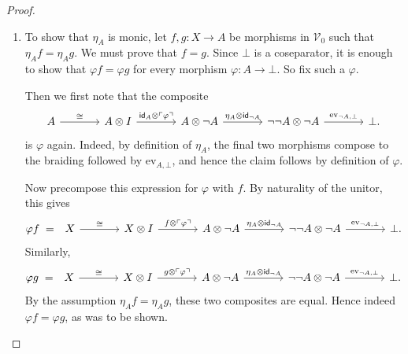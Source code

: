 \documentclass[11pt,onecolumn]{article}
\newcommand{\id}{\mathsf{id}}
\newcommand{\ev}{\mathrm{ev}}
\newcommand{\cV}{\mathscr{V}}
\newcommand{\name}[1]{\ulcorner #1 \urcorner}
\theoremstyle{plain}
\theoremstyle{remark}
\theoremstyle{definition}
\begin{document}
\begin{proof}
	\begin{enumerate}
		\item To show that $\eta_A$ is monic, let
			$f,g \colon X \to A$
			be morphisms in $\cV_0$ such that $\eta_A f = \eta_A g$. We must prove that $f=g$.
			Since $\bot$ is a coseparator, it is enough to show that $\varphi f = \varphi g$ for every morphism
			$\varphi \colon A \to \bot$.
			So fix such a $\varphi$.

			Then we first note that the composite
			\[
				\begin{tikzcd}[column sep=large]
					A \ar[r, "\cong"] & A \otimes I \ar[r, "\id_A \otimes \name{\varphi}"] & A \otimes \neg A \ar[r, "\eta_A \otimes \id_{\neg A}"] & \neg\neg A \otimes \neg A \ar[r, "\ev_{\neg A,\bot}"] & \bot.
				\end{tikzcd}
			\]
			is $\varphi$ again.
			Indeed, by definition of $\eta_A$, the final two morphisms compose to the braiding followed by $\ev_{A,\bot}$,
			and hence the claim follows by definition of $\varphi$.

			Now precompose this expression for $\varphi$ with $f$.
			By naturality of the unitor, this gives
			\[
				\varphi f
				\;=\;
				\begin{tikzcd}[column sep=large]
					X \ar[r, "\cong"] & X \otimes I \ar[r, "f \otimes \name{\varphi}"] & A \otimes \neg A \ar[r, "\eta_A \otimes \id_{\neg A}"] & \neg\neg A \otimes \neg A \ar[r, "\ev_{\neg A,\bot}"] & \bot.
				\end{tikzcd}
			\]
			Similarly,
			\[
				\varphi g
				\;=\;
				\begin{tikzcd}[column sep=large]
					X \ar[r, "\cong"] & X \otimes I \ar[r, "g \otimes \name{\varphi}"] & A \otimes \neg A \ar[r, "\eta_A \otimes \id_{\neg A}"] & \neg\neg A \otimes \neg A \ar[r, "\ev_{\neg A,\bot}"] & \bot.
				\end{tikzcd}
			\]
			By the assumption $\eta_A f = \eta_A g$, these two composites are equal.
			Hence indeed $\varphi f = \varphi g$, as was to be shown.


\end{enumerate}
\end{proof}
\end{document}
